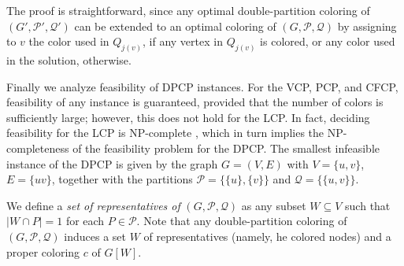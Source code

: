 \documentclass[preprint, 11pt, authoryear]{elsarticle}
\newtheorem{lemma}{Lemma}[section]
\newcommand{\PP}{{\mathcal P}}
\newcommand{\QQ}{{\mathcal Q}}
\newcommand{\dpcn}[1]{\chi_{DP}(#1)}
\begin{document}
The proof is straightforward, since any optimal double-partition coloring of $(G', \mathcal{P}', \mathcal{Q}')$ can be extended to an optimal coloring of $(G, \mathcal{P}, \mathcal{Q})$ by assigning to $v$ the color used in $Q_{j(v)}$, if any vertex in $Q_{j(v)}$ is colored, or any color used in the solution, otherwise.


\medskip 


Finally we analyze feasibility of DPCP instances.
For the VCP, PCP, and CFCP, feasibility of any instance is guaranteed, provided that the number of colors is sufficiently large; however, this does not hold for the LCP.
In fact, deciding feasibility for the LCP is NP-complete \citep{golovach2017survey}, which in turn implies the NP-completeness of the feasibility problem for the DPCP. The smallest infeasible instance of the DPCP is given by the graph $G=(V,E)$ with $V=\{u,v\}$, $E=\{uv\}$, together with the partitions $\PP=\{\{u\},\{v\}\}$ and $\QQ=\{\{u,v\}\}$.

We define a \emph{set of representatives of} $(G,\PP,\QQ)$  as any subset $W \subseteq V$ 
such that $|W \cap P| = 1$ for each $P \in \PP$. 
Note that any double-partition coloring of $(G,\PP,\QQ)$ induces a set $W$ 
of representatives (namely, he colored nodes) and a proper coloring 
$c$ of $G[W]$. 
\end{document}

